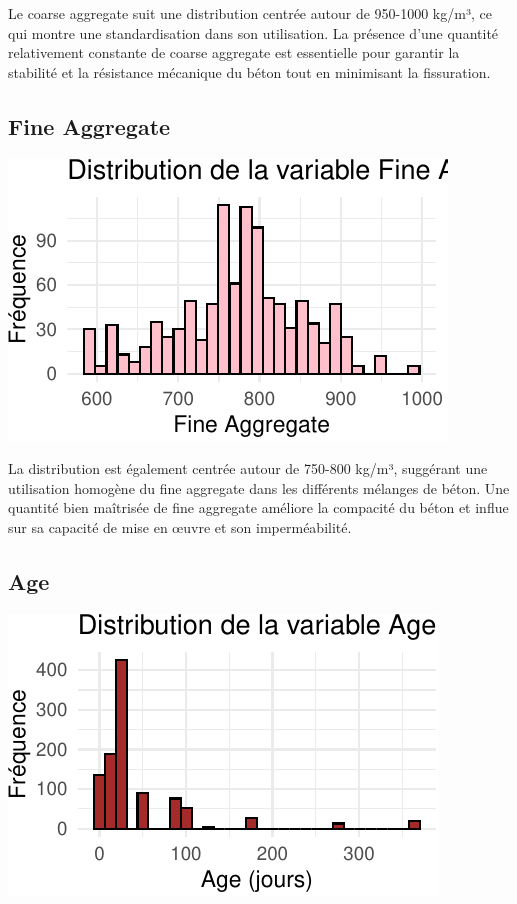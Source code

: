 \documentclass[
  12pt,
]{article}
\begin{document}
Le coarse aggregate suit une distribution centrée autour de 950-1000
kg/m³, ce qui montre une standardisation dans son utilisation. La
présence d'une quantité relativement constante de coarse aggregate est
essentielle pour garantir la stabilité et la résistance mécanique du
béton tout en minimisant la fissuration.

\subsection{Fine Aggregate}\label{fine-aggregate}

\begin{center}\includegraphics{rmd_final_files/figure-latex/unnamed-chunk-6-1} \end{center}

La distribution est également centrée autour de 750-800 kg/m³, suggérant
une utilisation homogène du fine aggregate dans les différents mélanges
de béton. Une quantité bien maîtrisée de fine aggregate améliore la
compacité du béton et influe sur sa capacité de mise en œuvre et son
imperméabilité.

\subsection{Age}\label{age}

\begin{center}\includegraphics{rmd_final_files/figure-latex/unnamed-chunk-7-1} \end{center}
\end{document}
